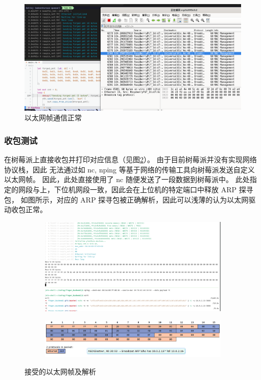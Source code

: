     \begin{figure}[ht]
        \centering
        \includegraphics[width=\textwidth]{./imgs/以太网帧通信正常.jpg}
        \caption{以太网帧通信正常}    \label{test::以太网帧发送}
    \end{figure}   

    \subsubsection{收包测试}

    在树莓派上直接收包并打印对应信息（见图\ref{test::以太网帧接收}）。
    由于目前树莓派并没有实现网络协议栈，因此
    无法通过如 nc, nping 等基于网络的传输工具向树莓派发送自定义以太网帧。
    因此，此处直接使用了 nc 随便发送了一段数据到树莓派中。
    此处指定的网段与上，下位机网段一致，因此会在上位机的特定端口中释放 ARP 探寻包，
    如图所示，对应的 ARP 探寻包被正确解析，因此可以浅薄的认为以太网驱动收包正常。

    \begin{figure}[ht]
        \centering
        \begin{subfigure}
            \centering
            \includegraphics[width=\textwidth]{./imgs/测试-以太网帧接收.png}
        \end{subfigure}
        \hfill
        \begin{subfigure}
            \centering
            \includegraphics[width=\textwidth]{./imgs/测试-以太网帧接收-解析.png}
        \end{subfigure}
        \caption{接受的以太网帧及解析} \label{test::以太网帧接收}
    \end{figure}


